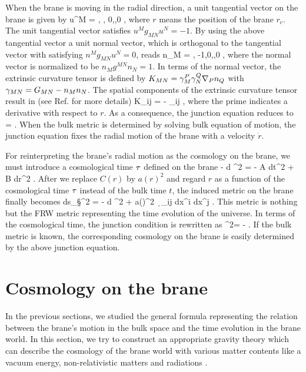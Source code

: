 \documentclass[12pt]{article}
\begin{document}
When the brane is moving in the radial direction, a unit tangential vector on the brane is given by
\be
u^M =  , , 0,\cdots,0 \rc ,
\ee
where $r$ means the position of the brane $r_c$. The unit tangential vector satisfies $u^M g_{MN} u^N = -1$. By using the above tangential vector a unit normal vector, which is orthogonal to the tangential vector with satisfying $n^M g_{MN} u^N = 0$, reads
\be
n_M =  \lc {}, -1,0,\cdots,0 \rc  ,
\ee
where the normal vector is normalized to be $n_M g^{MN} n_N =1$. In terms of the normal vector, the extrinsic curvature tensor is defined by $K_{MN} = \gamma^P_M \gamma^Q_N \nabla_P n_Q$ with $\gamma_{MN} = G_{MN} - n_M n_N$. The spatial components of the extrinsic curvature tensor result in (see Ref. \cite{Chamblin:1999ya} for more details)
\be
K_{ij} = -    \g_{ij} ,
\ee
where the prime indicates a derivative with respect to $r$. As a consequence, the junction equation reduces to
\be
{} =     .
\ee
When the bulk metric is determined by solving bulk equation of motion, the junction equation fixes the radial motion of the brane with a velocity $\dot{r}$.

For reinterpreting the brane's radial motion as the cosmology on the brane, we must introduce a cosmological time $\tau$ defined on the brane 
\be
- d \ta^2 =  - A dt^2 + B dr^2 .
\ee
After we replace $C(r)$ by $a(r)^2$ and regard $r$ as a function of the cosmological time $\tau$ instead of the bulk time $t$, the induced metric on the brane finally becomes
\be			{}
ds_\S^2 = - d \ta^2 + a(\ta)^2 \ \d_{ij} dx^i dx^j  .
\ee
This metric is nothing but the FRW metric representing the time evolution of the universe. In terms of the cosmological time, the junction condition is rewritten as
\be		{}
\ls {} \rs^2=    - .
\ee
If the bulk metric is known, the corresponding cosmology on the brane is easily determined by the above junction equation.



\section{Cosmology on the brane}

In the previous sections, we studied the general formula representing the relation between the brane's motion in the bulk space and the time evolution in the brane world. In this section, we try to construct an appropriate gravity theory which can describe the cosmology of the brane world with various matter contents like a vacuum energy, non-relativistic matters and radiations \cite{Kinney:2009vz}.
 
\end{document}
